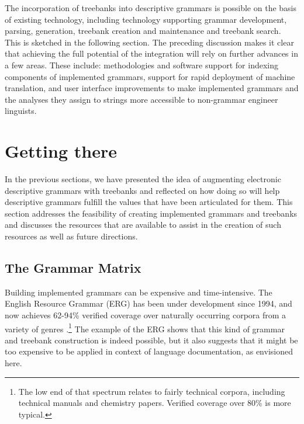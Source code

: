 
The incorporation of treebanks into descriptive grammars is possible
on the basis of existing technology, including technology supporting
grammar development, parsing, generation, treebank creation and
maintenance and treebank search.  This is sketched in the following
section.  The preceding discussion makes it clear that achieving the
full potential of the integration will rely on further advances in a
few areas. These include: methodologies and software support for
indexing components of implemented grammars, support for rapid
deployment of machine translation, and user interface improvements to
make implemented grammars and the analyses they assign to strings more
accessible to non-grammar engineer linguists.


\section{Getting there}
\label{sec:gt}

In the previous sections, we have presented the idea of augmenting
electronic descriptive grammars with treebanks and reflected on how
doing so will help descriptive grammars fulfill the values that 
have been articulated for them.  This section addresses the feasibility
of creating implemented grammars and treebanks and discusses the
resources that are available to assist in the creation of such
resources as well as future directions.

\subsection{The Grammar Matrix}
\label{sec:gm}

Building implemented grammars can be expensive and time-intensive.
The English Resource Grammar (ERG) has been under development since 1994,
and now achieves 62-94\% verified coverage over naturally occurring
corpora from a variety of genres \citep{Flickinger:11}.\footnote{The
low end of that spectrum relates to fairly technical corpora,
including technical manuals and chemistry papers.  Verified coverage
over 80\% is more typical.}  The example of the ERG shows that
this kind of grammar and treebank construction is indeed possible,
but it also suggests that it might be too expensive to be applied
in context of language documentation, as envisioned here.

